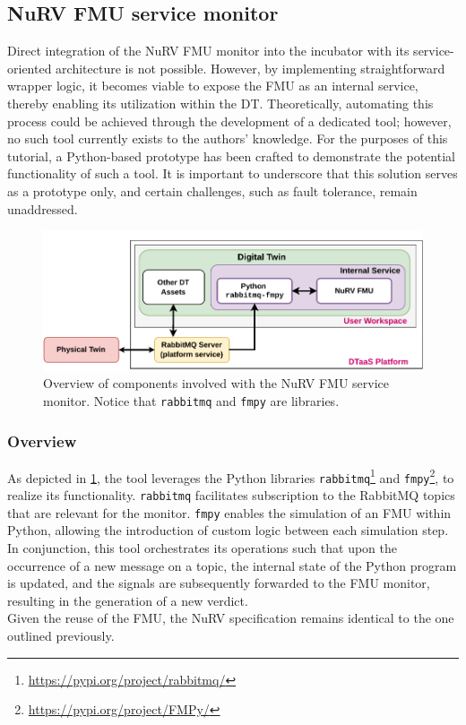 \subsection{NuRV FMU service monitor}\label{subsec:NuRVsermoni}
Direct integration of the NuRV FMU monitor into the incubator with its service-oriented architecture is not possible.
However, by implementing straightforward wrapper logic, it becomes viable to expose the FMU as an internal service, thereby enabling its utilization within the DT.
Theoretically, automating this process could be achieved through the development of a dedicated tool; however, no such tool currently exists to the authors' knowledge.
For the purposes of this tutorial, a Python-based prototype has been crafted to demonstrate the potential functionality of such a tool.
It is important to underscore that this solution serves as a prototype only, and certain challenges, such as fault tolerance, remain unaddressed.%
%
\begin{figure}[ht]
	\centering
	\includegraphics[width=\columnwidth]{images/NuRV-FMU-integration.pdf}
	\caption{Overview of components involved with the NuRV FMU service monitor. Notice that \lstinline{rabbitmq} and \lstinline{fmpy} are libraries.}
	\label{fig:nurv-fmu-service}
\end{figure}%
%
\subsubsection{Overview}
As depicted in \cref{fig:nurv-fmu-service}, the tool leverages the Python libraries \lstinline{rabbitmq}\footnote{\url{https://pypi.org/project/rabbitmq/}} and \lstinline{fmpy}\footnote{\url{https://pypi.org/project/FMPy/}}, to realize its functionality.
\lstinline{rabbitmq} facilitates subscription to the RabbitMQ topics that are relevant for the monitor.
\lstinline{fmpy} enables the simulation of an FMU within Python, allowing the introduction of custom logic between each simulation step.
In conjunction, this tool orchestrates its operations such that upon the occurrence of a new message on a topic, the internal state of the Python program is updated, and the signals are subsequently forwarded to the FMU monitor, resulting in the generation of a new verdict.\\
Given the reuse of the FMU, the NuRV specification remains identical to the one outlined previously.

